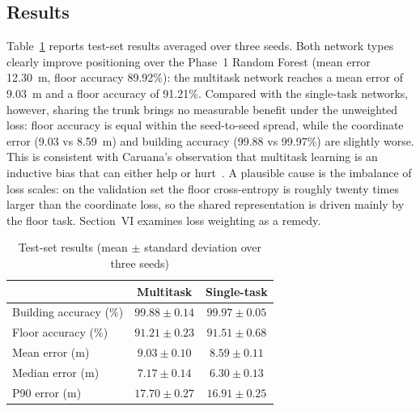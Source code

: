 \subsection{Results}
Table~\ref{tab:dl_results} reports test-set results averaged over three seeds. Both network types clearly
improve positioning over the Phase~1 Random Forest (mean error 12.30~m, floor accuracy 89.92\%): the multitask
network reaches a mean error of 9.03~m and a floor accuracy of 91.21\%. Compared with the single-task networks,
however, sharing the trunk brings no measurable benefit under the unweighted loss: floor accuracy is equal
within the seed-to-seed spread, while the coordinate error (9.03 vs 8.59~m) and building accuracy (99.88 vs
99.97\%) are slightly worse. This is consistent with Caruana's observation that multitask learning is an
inductive bias that can either help or hurt~\cite{caruana1997multitask}. A plausible cause is the imbalance of
loss scales: on the validation set the floor cross-entropy is roughly twenty times larger than the
coordinate loss, so the shared representation is driven mainly by the floor task. Section~VI examines loss
weighting as a remedy.

\begin{table}[!t]
\centering
\caption{Test-set results (mean $\pm$ standard deviation over three seeds)}
\label{tab:dl_results}
\begin{tabular}{lcc}
\toprule
 & \textbf{Multitask} & \textbf{Single-task} \\
\midrule
Building accuracy (\%) & $99.88 \pm 0.14$ & $99.97 \pm 0.05$ \\
Floor accuracy (\%) & $91.21 \pm 0.23$ & $91.51 \pm 0.68$ \\
Mean error (m) & $9.03 \pm 0.10$ & $8.59 \pm 0.11$ \\
Median error (m) & $7.17 \pm 0.14$ & $6.30 \pm 0.13$ \\
P90 error (m) & $17.70 \pm 0.27$ & $16.91 \pm 0.25$ \\
\bottomrule
\end{tabular}
\end{table}
